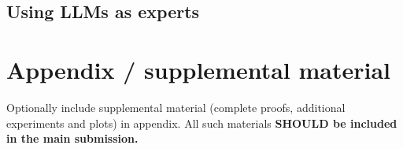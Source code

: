 \documentclass{article}
\begin{document}
\subsection{Using LLMs as experts}







\appendix

\section{Appendix / supplemental material}


Optionally include supplemental material (complete proofs, additional experiments and plots) in appendix.
All such materials \textbf{SHOULD be included in the main submission.}



\end{document}
